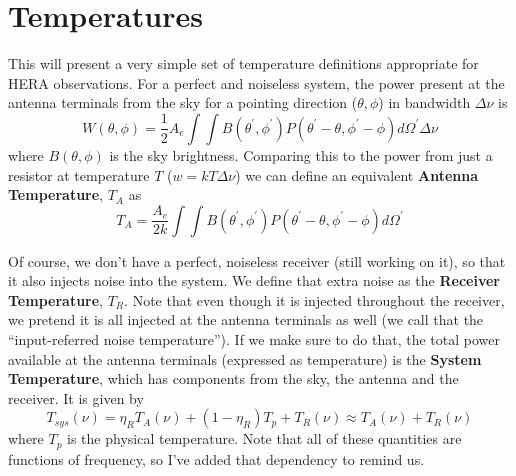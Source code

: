 \documentclass[11pt]{article}
\begin{document}
\section{Temperatures}
This will present a very simple set of temperature definitions appropriate for HERA observations.  For a perfect and noiseless system, the power present at the antenna terminals from the sky for a pointing direction ($\theta, \phi$) in bandwidth $\Delta\nu$ is
\begin{equation}
W(\theta,\phi) = \frac{1}{2}A_e\int \int B(\theta^\prime,\phi^\prime)P(\theta^\prime-\theta,\phi^\prime-\phi)d\Omega^\prime \Delta \nu
\end{equation}
where $B(\theta,\phi)$ is the sky brightness.  
Comparing this to the power from just a resistor at temperature $T$ ($w = kT\Delta\nu$) we can define an equivalent {\bf Antenna Temperature}, $T_A$ as
\begin{equation}
\label{Eq:TA}
T_A =  \frac{A_e}{2k}\int \int B(\theta^\prime,\phi^\prime)P(\theta^\prime-\theta,\phi^\prime-\phi)d\Omega^\prime
\end{equation}

Of course, we don't have a perfect, noiseless receiver (still working on it), so that it also injects noise into the system.  We define that extra noise as the {\bf Receiver Temperature}, $T_R$.  Note that even though it is injected throughout the receiver, we pretend it is all injected at the antenna terminals as well (we call that the ``input-referred noise temperature'').  If we make sure to do that, the total power available at the antenna terminals (expressed as temperature) is the {\bf System Temperature}, which has components from the sky, the antenna and the receiver.  It is given by
\begin{equation}
T_{sys}(\nu) = \eta_R T_A(\nu) + (1-\eta_R)T_p + T_R(\nu) \approx T_A(\nu) + T_R(\nu)
\end{equation}
where $T_p$ is the physical temperature.
Note that all of these quantities are functions of frequency, so I've added that dependency to remind us.
\end{document}
